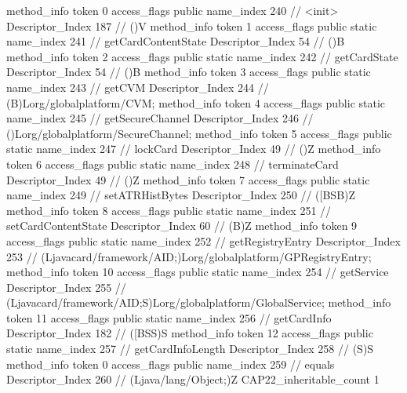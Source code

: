{{{{				method_info {
					token	0
					access_flags	public
					name_index	240		// <init>
					Descriptor_Index	187		// ()V
				}
				method_info {
					token	1
					access_flags	public static
					name_index	241		// getCardContentState
					Descriptor_Index	54		// ()B
				}
				method_info {
					token	2
					access_flags	public static
					name_index	242		// getCardState
					Descriptor_Index	54		// ()B
				}
				method_info {
					token	3
					access_flags	public static
					name_index	243		// getCVM
					Descriptor_Index	244		// (B)Lorg/globalplatform/CVM;
				}
				method_info {
					token	4
					access_flags	public static
					name_index	245		// getSecureChannel
					Descriptor_Index	246		// ()Lorg/globalplatform/SecureChannel;
				}
				method_info {
					token	5
					access_flags	public static
					name_index	247		// lockCard
					Descriptor_Index	49		// ()Z
				}
				method_info {
					token	6
					access_flags	public static
					name_index	248		// terminateCard
					Descriptor_Index	49		// ()Z
				}
				method_info {
					token	7
					access_flags	public static
					name_index	249		// setATRHistBytes
					Descriptor_Index	250		// ([BSB)Z
				}
				method_info {
					token	8
					access_flags	public static
					name_index	251		// setCardContentState
					Descriptor_Index	60		// (B)Z
				}
				method_info {
					token	9
					access_flags	public static
					name_index	252		// getRegistryEntry
					Descriptor_Index	253		// (Ljavacard/framework/AID;)Lorg/globalplatform/GPRegistryEntry;
				}
				method_info {
					token	10
					access_flags	public static
					name_index	254		// getService
					Descriptor_Index	255		// (Ljavacard/framework/AID;S)Lorg/globalplatform/GlobalService;
				}
				method_info {
					token	11
					access_flags	public static
					name_index	256		// getCardInfo
					Descriptor_Index	182		// ([BSS)S
				}
				method_info {
					token	12
					access_flags	public static
					name_index	257		// getCardInfoLength
					Descriptor_Index	258		// (S)S
				}
				method_info {
					token	0
					access_flags	public
					name_index	259		// equals
					Descriptor_Index	260		// (Ljava/lang/Object;)Z
				}
			}
			CAP22_inheritable_count	1
		}
	}
}

